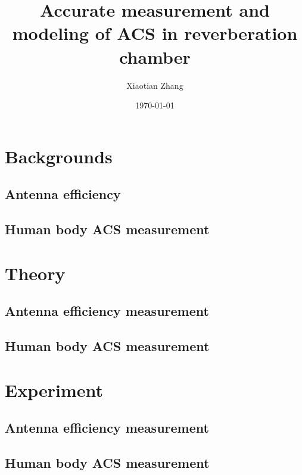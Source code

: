 \documentclass{article}
\title{Accurate measurement and modeling of ACS in reverberation chamber}
\date{\today}
\author{Xiaotian Zhang}
\begin{document}
\maketitle
\newpage
{}

\section{Backgrounds}
\subsection{Antenna efficiency}
\subsection{Human body ACS measurement}
\section{Theory}
\subsection{Antenna efficiency measurement}
\subsection{Human body ACS measurement}
\section{Experiment}
\subsection{Antenna efficiency measurement}
\subsection{Human body ACS measurement}
\end{document}
